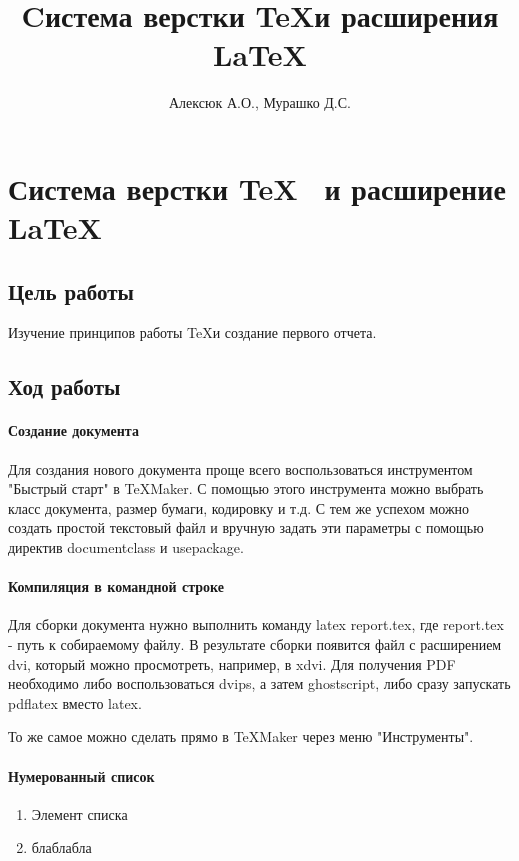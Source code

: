 \documentclass[10pt,a4paper]{article}
\author{Алексюк А.О., Мурашко Д.С.}
\title{Cистема верстки \TeX и расширения \LaTeX}
\begin{document}
\maketitle
\tableofcontents
\pagebreak
\section{Система верстки \TeX~ и расширение \LaTeX}
\subsection{Цель работы}
Изучение принципов работы \TeX и создание первого отчета.
\subsection{Ход работы}
\paragraph{Создание документа}

Для создания нового документа проще всего воспользоваться инструментом "Быстрый старт" в TeXMaker. С помощью этого инструмента можно выбрать класс документа, размер бумаги, кодировку и т.д. С тем же успехом можно создать простой текстовый файл и вручную задать эти параметры с помощью директив documentclass и usepackage.

\paragraph{Компиляция в командной строке}

Для сборки документа нужно выполнить команду latex report.tex, где report.tex - путь к собираемому файлу. В результате сборки появится файл с расширением dvi, который можно просмотреть, например, в xdvi. Для получения PDF необходимо либо воспользоваться dvips, а затем ghostscript, либо сразу запускать pdflatex вместо latex.

То же самое можно сделать прямо в TeXMaker через меню "Инструменты".

\paragraph{Нумерованный список}
\begin{enumerate}
\item Элемент списка
\item блаблабла
\end{enumerate}
\end{document}
